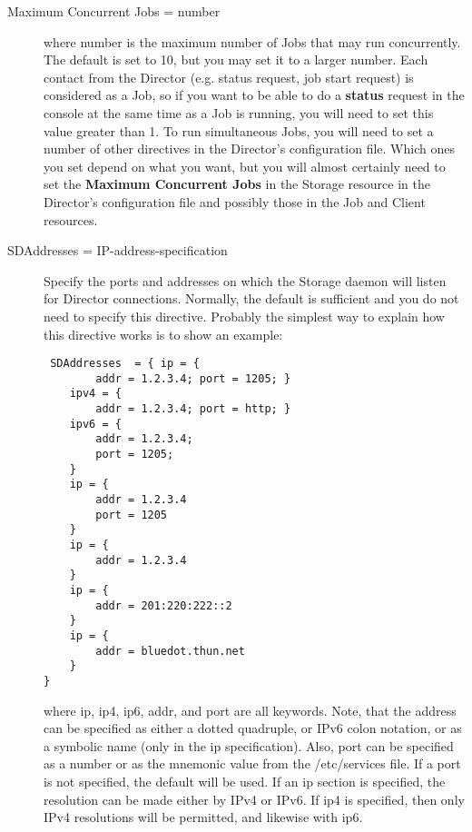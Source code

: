 \begin{description}
\item [Maximum Concurrent Jobs = \lt{}number\gt{}]
   where \lt{}number\gt{} is the maximum number of Jobs that may run
   concurrently.  The default is set to 10, but you may set it to a larger
   number.  Each contact from the Director (e.g.  status request, job start
   request) is considered as a Job, so if you want to be able to do a {\bf
   status} request in the console at the same time as a Job is running, you
   will need to set this value greater than 1.  To run simultaneous Jobs,
   you will need to set a number of other directives in the Director's
   configuration file.  Which ones you set depend on what you want, but you
   will almost certainly need to set the {\bf Maximum Concurrent Jobs} in
   the Storage resource in the Director's configuration file and possibly
   those in the Job and Client resources.

\item [SDAddresses = \lt{}IP-address-specification\gt{}]
   Specify the ports and addresses on which the Storage daemon will listen
   for Director connections.  Normally, the default is sufficient and you
   do not need to specify this directive.  Probably the simplest way to
   explain how this directive works is to show an example:

\footnotesize
\begin{verbatim}
 SDAddresses  = { ip = {
        addr = 1.2.3.4; port = 1205; }
    ipv4 = {
        addr = 1.2.3.4; port = http; }
    ipv6 = {
        addr = 1.2.3.4;
        port = 1205;
    }
    ip = {
        addr = 1.2.3.4
        port = 1205
    }
    ip = {
        addr = 1.2.3.4
    }
    ip = {
        addr = 201:220:222::2
    }
    ip = {
        addr = bluedot.thun.net
    }
}
\end{verbatim}
\normalsize

where ip, ip4, ip6, addr, and port are all keywords. Note, that  the address
can be specified as either a dotted quadruple, or  IPv6 colon notation, or as
a symbolic name (only in the ip specification).  Also, port can be specified
as a number or as the mnemonic value from  the /etc/services file.  If a port
is not specified, the default will be used. If an ip  section is specified,
the resolution can be made either by IPv4 or  IPv6. If ip4 is specified, then
only IPv4 resolutions will be permitted,  and likewise with ip6.  


\end{description}
